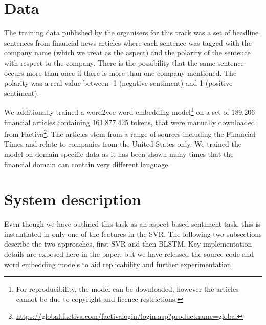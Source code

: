 \documentclass[11pt,a4paper]{article}
\begin{document}
\section{Data}
\label{sec:data}
The training data published by the organisers for this track was a set of headline sentences from financial news articles where each sentence was tagged with
the company name (which we treat as the aspect) and the polarity of the sentence with respect to the company. There is the possibility that the same sentence occurs more than once if there is more than one company mentioned. The polarity was a real value between -1 (negative sentiment) and 1 (positive sentiment).

We additionally trained a word2vec \cite{mikolov2013efficient} word embedding model\footnote{For reproducibility, the model can be downloaded, however the articles cannot be due to copyright and licence restrictions.} on a set of 189,206 financial articles containing 161,877,425 tokens, that were manually downloaded from Factiva\footnote{\url{https://global.factiva.com/factivalogin/login.asp?productname=global}}. The articles stem from a range of sources including the Financial Times and relate to companies from the United States only. We trained the model on domain specific data as it has been shown many times that the financial domain can contain very different language.


\section{System description}
\label{sec:system description}
Even though we have outlined this task as an aspect based sentiment task, this is instantiated in only one of the features in the SVR. The following two subsections describe the two approaches, first SVR and then BLSTM. Key implementation details are exposed here in the paper, but we have released the source code and word embedding models  to aid replicability and further experimentation.
\end{document}
